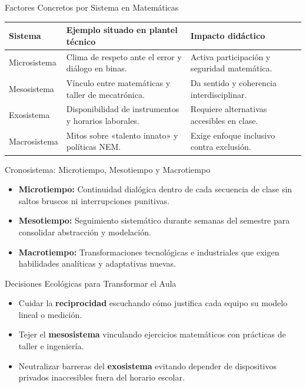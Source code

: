 \documentclass[aspectratio=169,spanish,xcolor=table]{beamer}
\begin{document}
\begin{frame}{Factores Concretos por Sistema en Matemáticas}
  \scriptsize\renewcommand{\arraystretch}{1.35}
  \begin{tabular}{p{2.3cm}p{5.5cm}p{5.2cm}}
    \toprule
    \rowcolor{iiiepePale} \textbf{Sistema} & \textbf{Ejemplo situado en plantel técnico} & \textbf{Impacto didáctico} \\
    \midrule
    Microsistema & Clima de respeto ante el error y diálogo en binas. & Activa participación y seguridad matemática. \\
    Mesosistema & Vínculo entre matemáticas y taller de mecatrónica. & Da sentido y coherencia interdisciplinar. \\
    Exosistema & Disponibilidad de instrumentos y horarios laborales. & Requiere alternativas accesibles en clase. \\
    Macrosistema & Mitos sobre «talento innato» y políticas NEM. & Exige enfoque inclusivo contra exclusión. \\
    \bottomrule
  \end{tabular}
\end{frame}

\begin{frame}{Cronosistema: Microtiempo, Mesotiempo y Macrotiempo}
  \begin{itemize}\normalsize
    \item \textbf{\color{iiiepeNavy}Microtiempo:} Continuidad dialógica dentro de cada secuencia de clase sin saltos bruscos ni interrupciones punitivas.
    \item \textbf{\color{iiiepeBlue}Mesotiempo:} Seguimiento sistemático durante semanas del semestre para consolidar abstracción y modelación.
    \item \textbf{\color{iiiepeAqua!75!black}Macrotiempo:} Transformaciones tecnológicas e industriales que exigen habilidades analíticas y adaptativas nuevas.
  \end{itemize}
\end{frame}

\begin{frame}{Decisiones Ecológicas para Transformar el Aula}
  \begin{itemize}\normalsize
    \item Cuidar la \textbf{reciprocidad} escuchando cómo justifica cada equipo su modelo lineal o medición.
    \item Tejer el \textbf{mesosistema} vinculando ejercicios matemáticos con prácticas de taller e ingeniería.
    \item Neutralizar barreras del \textbf{exosistema} evitando depender de dispositivos privados inaccesibles fuera del horario escolar.
  \end{itemize}
\end{frame}
\end{document}
